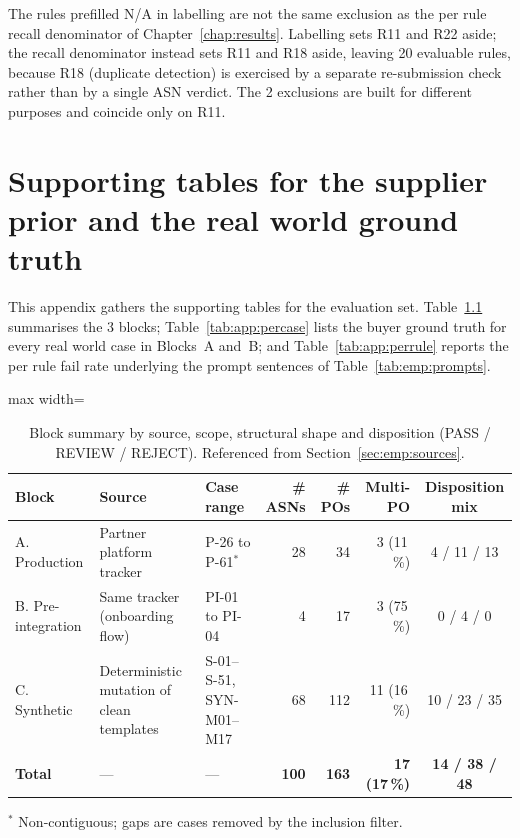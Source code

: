 The rules prefilled N/A in labelling are not the same exclusion as the per rule recall denominator of Chapter~\ref{chap:results}. Labelling sets R11 and R22 aside; the recall denominator instead sets R11 and R18 aside, leaving 20 evaluable rules, because R18 (duplicate detection) is exercised by a separate re-submission check rather than by a single ASN verdict. The 2 exclusions are built for different purposes and coincide only on R11.


\chapter{Supporting tables for the supplier prior and the real world ground truth} \label{app:emp:supporting}

This appendix gathers the supporting tables for the evaluation set. Table~\ref{tab:emp:blocks} summarises the 3 blocks; Table~\ref{tab:app:percase} lists the buyer ground truth for every real world case in Blocks~A and~B; and Table~\ref{tab:app:perrule} reports the per rule fail rate underlying the prompt sentences of Table~\ref{tab:emp:prompts}.

\begin{table}[htbp]
\centering
\caption{Block summary by source, scope, structural shape and disposition (PASS / REVIEW / REJECT). Referenced from Section~\ref{sec:emp:sources}.}
\label{tab:emp:blocks}
\small
\renewcommand{\arraystretch}{1.3}
\begin{adjustbox}{max width=\textwidth}
\begin{tabular}{@{}llp{3.6cm}rrrc@{}}
\toprule
\textbf{Block} & \textbf{Source} & \textbf{Case range} & \textbf{\# ASNs} & \textbf{\# POs} & \textbf{Multi-PO} & \textbf{Disposition mix} \\
\midrule
A. Production       & Partner platform tracker                  & P-26 to P-61$^{*}$            & 28 & 34  & 3 (11\,\%)  & 4 / 11 / 13 \\
B. Pre-integration  & Same tracker (onboarding flow)            & PI-01 to PI-04                & 4  & 17  & 3 (75\,\%)  & 0 / 4 / 0 \\
C. Synthetic        & Deterministic mutation of clean templates & S-01--S-51, SYN-M01--M17 & 68 & 112 & 11 (16\,\%) & 10 / 23 / 35 \\
\midrule
\textbf{Total} & --- & --- & \textbf{100} & \textbf{163} & \textbf{17 (17\,\%)} & \textbf{14 / 38 / 48} \\
\bottomrule
\end{tabular}
\end{adjustbox}
\par\vspace{0.2em}\footnotesize{$^{*}$ Non-contiguous; gaps are cases removed by the inclusion filter.}
\end{table}

